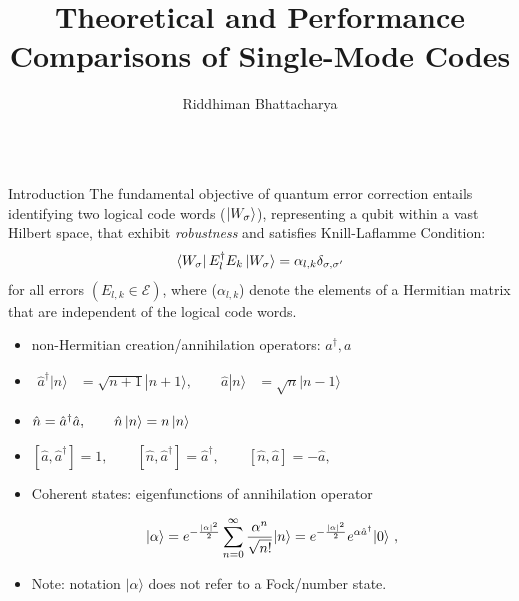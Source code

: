 \documentclass[8pt,final,hyperref={pdfpagelabels=false}]{beamer}
\title{\huge Theoretical and Performance \\
\vspace{0.8cm}
Comparisons of Single-Mode Codes} %
\author{Riddhiman Bhattacharya} %
\institute{Visvabharati University, Santiniketan, India
}
\theoremstyle{plain}
\newcommand\0{\mathbf{0}}
\begin{document}
\begin{frame}
\begin{columns}[t]
\begin{column}{.23\textwidth}                
    \begin{block}{Introduction}
The fundamental objective of quantum error correction entails identifying two logical code words ($\ket{W_\sigma}$), representing a qubit within a vast Hilbert space, that exhibit \textit{robustness} and satisfies Knill-Laflamme Condition: 
$$ \bra{W_\sigma} E_l^\dag E_k \ket{W_\sigma} = \alpha_{l, k} \delta_{\sigma, \sigma'}$$
for all errors $(E_{l,k} \in \mathcal{E})$, where ($\alpha_{l,k}$) denote the elements of a Hermitian matrix that are independent of the logical code words.

      \begin{itemize}
\item non-Hermitian creation/annihilation operators: $a^\dag, a$
\item ${{\begin{aligned}\hat{a}^{\dagger }|n\rangle &={\sqrt {n+1}}|n+1\rangle, \qquad \hat{a}|n\rangle &={\sqrt {n}}|n-1\rangle\end{aligned}}}$
\item $\hat{n} = \hat{a}^{\dag }\hat{a}, \qquad \hat{n}\ket{n} = n\ket{n} $
\item $[\hat{a},\hat{a}^{\dag }]=1,\qquad [\hat{n},\hat{a}^{\dag }]=\hat{a}^{\dag },\qquad [\hat{n},\hat{a}]=-\hat{a},$
\item Coherent states: eigenfunctions of annihilation operator 

$$
|\alpha\rangle =e^{-{|\alpha|^2\over2}}\sum_{n=0}^{\infty}{\alpha^n\over\sqrt{n!}}|n\rangle =e^{-{|\alpha|^2\over2}}e^{\alpha\hat a^\dagger}|0\rangle ~,
$$

\item Note: notation ${\displaystyle |\alpha \rangle }$  does not refer to a Fock/number state.


\end{itemize}
\end{block}
\end{column}
\end{columns}
\end{frame}
\end{document}
